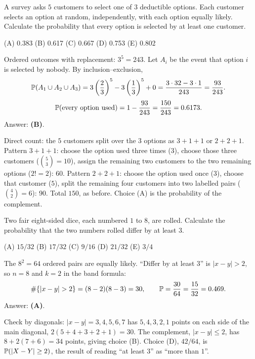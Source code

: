\begin{example}
A survey asks $5$ customers to select one of $3$ deductible options. Each customer selects an
option at random, independently, with each option equally likely. Calculate the probability
that every option is selected by at least one customer.
\par\smallskip\noindent (A) 0.383 \quad (B) 0.617 \quad (C) 0.667 \quad (D) 0.753 \quad (E) 0.802
\end{example}
\begin{solution}
Ordered outcomes with replacement: $3^5 = 243$. Let $A_i$ be the event that option $i$ is
selected by nobody. By inclusion--exclusion,
\[
\mathbb{P}(A_1\cup A_2\cup A_3) = 3\left(\frac{2}{3}\right)^5 - 3\left(\frac{1}{3}\right)^5 + 0
= \frac{3\cdot 32 - 3\cdot 1}{243} = \frac{93}{243} .
\]
\[
\mathbb{P}(\text{every option used}) = 1 - \frac{93}{243} = \frac{150}{243} = 0.6173 .
\]
Answer: \textbf{(B)}.

Direct count: the $5$ customers split over the $3$ options as $3{+}1{+}1$ or $2{+}2{+}1$.
Pattern $3{+}1{+}1$: choose the option used three times ($3$), choose those three customers
($\binom{5}{3} = 10$), assign the remaining two customers to the two remaining options
($2! = 2$): $60$. Pattern $2{+}2{+}1$: choose the option used once ($3$), choose that customer
($5$), split the remaining four customers into two labelled pairs ($\binom{4}{2} = 6$): $90$.
Total $150$, as before. Choice (A) is the probability of the complement.
\end{solution}

\begin{example}
Two fair eight-sided dice, each numbered $1$ to $8$, are rolled. Calculate the probability
that the two numbers rolled differ by at least $3$.
\par\smallskip\noindent (A) $15/32$ \quad (B) $17/32$ \quad (C) $9/16$ \quad (D) $21/32$ \quad (E) $3/4$
\end{example}
\begin{solution}
The $8^2 = 64$ ordered pairs are equally likely. ``Differ by at least $3$'' is $|x-y|>2$,
so $n=8$ and $k=2$ in the band formula:
\[
\#\{|x-y|>2\} = (8-2)(8-3) = 30, \qquad \Prob = \frac{30}{64} = \frac{15}{32} = 0.469 .
\]
Answer: \textbf{(A)}.

Check by diagonals: $|x-y|=3,4,5,6,7$ has $5,4,3,2,1$ points on each side of the main
diagonal, $2(5+4+3+2+1) = 30$. The complement, $|x-y|\le 2$, has $8+2(7+6) = 34$ points,
giving choice (B). Choice (D), $42/64$, is $\mathbb{P}(|X-Y|\ge 2)$, the result of reading
``at least $3$'' as ``more than $1$''.
\end{solution}

